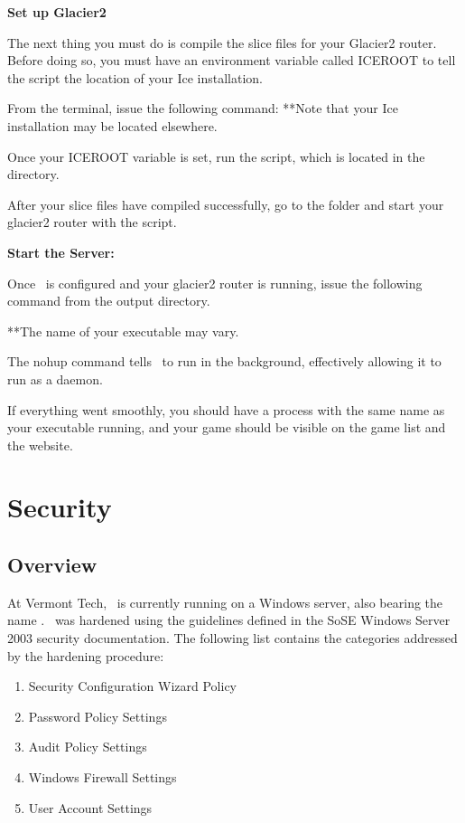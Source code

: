 \textbf{Set up Glacier2}

The next thing you must do is compile the slice files for your Glacier2 router. Before doing so, you must have an environment variable called ICEROOT to tell the script the location of your Ice installation.

From the terminal, issue the following command:
**Note that your Ice installation may be located elsewhere.

Once your ICEROOT variable is set, run the  script, which is located in the  directory.

After your slice files have compiled successfully, go to the  folder and start your glacier2 router with the  script.

\textbf{Start the Server:}

Once \GameServer\ is configured and your glacier2 router is running, issue the following command from the output directory.

**The name of your executable may vary.

The nohup command tells \GameServer\ to run in the background, effectively allowing it to run as a daemon.

If everything went smoothly, you should have a process with the same name as your executable running, and your game should be visible on the game list and the website.

\section{Security}

\subsection{Overview}

At Vermont Tech, \GameServer\ is currently running on a Windows server, also bearing the name \GameServer. \GameServer\ was hardened using the guidelines defined in the SoSE Windows Server 2003 security documentation.  The following list contains the categories addressed by the hardening procedure:

\begin{enumerate}
\item Security Configuration Wizard Policy
\item Password Policy Settings
\item Audit Policy Settings
\item Windows Firewall Settings
\item User Account Settings
\end{enumerate}

